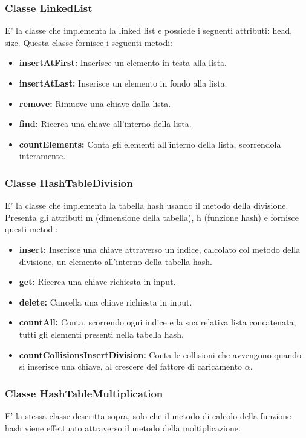 \documentclass{article}
\begin{document}
\subsubsection{Classe LinkedList}
E' la classe che implementa la linked list e possiede i seguenti attributi: head, size.
Questa classe fornisce i seguenti metodi:
\begin{itemize}
    \item \textbf{insertAtFirst:} Inserisce un elemento in testa alla lista.
    \item \textbf{insertAtLast:} Inserisce un elemento in fondo alla lista.
    \item \textbf{remove:} Rimuove una chiave dalla lista.
    \item \textbf{find:} Ricerca una chiave all'interno della lista.
    \item \textbf{countElements:} Conta gli elementi all'interno della lista, scorrendola interamente.
\end{itemize}

\subsubsection{Classe HashTableDivision}
E' la classe che implementa la tabella hash usando il metodo della divisione.
Presenta gli attributi m (dimensione della tabella), h (funzione hash) e fornisce questi metodi:
\begin{itemize}
    \item \textbf{insert:} Inserisce una chiave attraverso un indice, calcolato col metodo della divisione, un elemento all'interno della tabella hash.
    \item \textbf{get:} Ricerca una chiave richiesta in input.
    \item \textbf{delete:} Cancella una chiave richiesta in input.
    \item \textbf{countAll:} Conta, scorrendo ogni indice e la sua relativa lista concatenata, tutti gli elementi presenti nella tabella hash.
    \item \textbf{countCollisionsInsertDivision:} Conta le collisioni che avvengono quando si inserisce una chiave, al crescere del fattore di caricamento $\alpha$.
\end{itemize}

\subsubsection{Classe HashTableMultiplication}
E' la stessa classe descritta sopra, solo che il metodo di calcolo della funzione hash viene effettuato attraverso il metodo della moltiplicazione.
\end{document}
